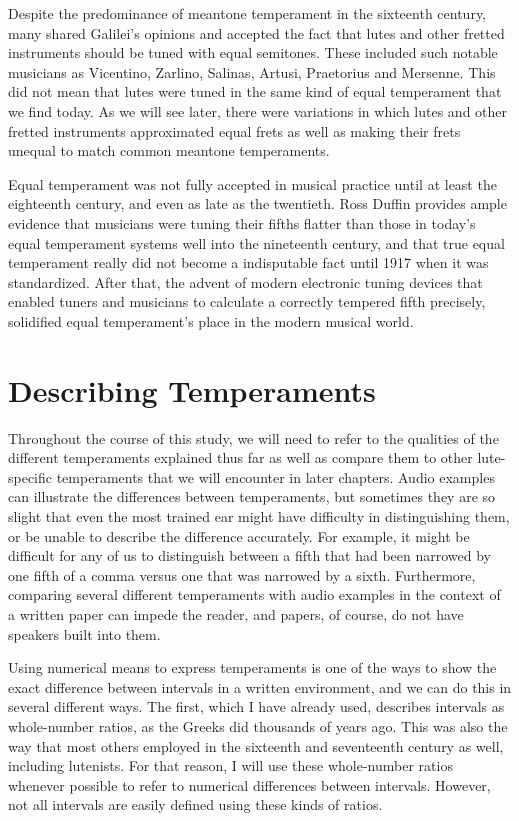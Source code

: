 Despite the predominance of meantone temperament in the sixteenth century, many shared
Galilei's opinions and accepted the fact that lutes and other fretted instruments should
be tuned with equal semitones.  These included such notable musicians as Vicentino,
Zarlino, Salinas, Artusi, Praetorius and Mersenne. \autocite[19]{ML:1} This did not
mean that lutes were tuned in the same kind of equal temperament that we find today. As
we will see later, there were variations in which lutes and other fretted
instruments approximated equal frets as well as making their frets unequal to match
common meantone temperaments.

Equal temperament was not fully accepted in musical practice until at least the
eighteenth century, and even as late as the twentieth.  Ross Duffin provides ample
evidence that musicians were tuning their fifths flatter than those in today's equal
temperament systems well into the nineteenth century, and that true equal temperament
really did not become a indisputable fact until 1917 when it was standardized.
\autocite[138]{RD:1}  After that, the advent of modern electronic tuning devices that
enabled tuners and musicians to calculate a correctly tempered fifth precisely,
solidified equal temperament's place in the modern musical world.

\section{Describing Temperaments}

Throughout the course of this study, we will need to refer to the qualities of the different
temperaments explained thus far as well as compare them to other lute-specific temperaments that we
will encounter in later chapters.  Audio examples can illustrate the differences between
temperaments, but sometimes they are so slight that even the most trained ear might have difficulty
in distinguishing them, or be unable to describe the difference accurately. For example, it might be
difficult for any of us to distinguish between a fifth that had been narrowed by one fifth of a
comma versus one that was narrowed by a sixth.  Furthermore, comparing several different
temperaments with audio examples in the context of a written paper can impede the reader, and
papers, of course, do not have speakers built into them.

Using numerical means to express temperaments is one of the ways to show the exact
difference between intervals in a written environment, and we can do this in several different ways.
The first, which I have already used, describes intervals as whole-number ratios, as the Greeks did
thousands of years ago.  This was also the way that most others employed in the sixteenth and
seventeenth century as well, including lutenists.  For that reason, I will use these whole-number
ratios whenever possible to refer to numerical differences between intervals. However, not all
intervals are easily defined using these kinds of ratios.

